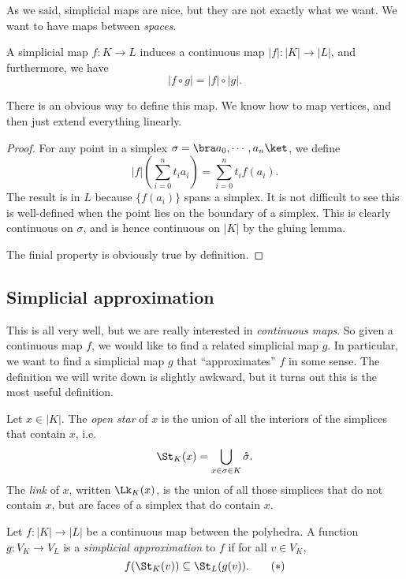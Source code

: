 \documentclass[a4paper]{article}
\begin{document}
As we said, simplicial maps are nice, but they are not exactly what we want. We want to have maps between \emph{spaces}.
\begin{lemma}
  A simplicial map $f: K \to L$ induces a continuous map $|f|: |K|\to |L|$, and furthermore, we have
  \[
    |f\circ g| = |f|\circ |g|.
  \]
\end{lemma}
There is an obvious way to define this map. We know how to map vertices, and then just extend everything linearly.
\begin{proof}
  For any point in a simplex $\sigma = \bra a_0,\cdots, a_n\ket$, we define
  \[
    |f|\left(\sum_{i = 0}^n t_i a_i\right) = \sum_{i = 0}^n t_i f(a_i).
  \]
  The result is in $L$ because $\{f(a_i)\}$ spans a simplex. It is not difficult to see this is well-defined when the point lies on the boundary of a simplex. This is clearly continuous on $\sigma$, and is hence continuous on $|K|$ by the gluing lemma.

  The finial property is obviously true by definition.
\end{proof}

\subsection{Simplicial approximation}
This is all very well, but we are really interested in \emph{continuous maps}. So given a continuous map $f$, we would like to find a related simplicial map $g$. In particular, we want to find a simplicial map $g$ that ``approximates'' $f$ in some sense. The definition we will write down is slightly awkward, but it turns out this is the most useful definition.

\begin{defi}
  Let $x \in |K|$. The \emph{open star} of $x$ is the union of all the interiors of the simplices that contain $x$, i.e.
  \[
    \St_K(x) = \bigcup_{x \in \sigma \in K} \mathring{\sigma}.
  \]
  The \emph{link} of $x$, written $\Lk_K(x)$, is the union of all those simplices that do not contain $x$, but are faces of a simplex that do contain $x$.
\end{defi}

\begin{defi}
  Let $f: |K| \to |L|$ be a continuous map between the polyhedra. A function $g: V_K \to V_L$ is a \emph{simplicial approximation} to $f$ if for all $v \in V_K$,
  \[
    f(\St_K(v)) \subseteq \St_L(g(v)).\tag{$*$}
  \]
\end{defi}
\end{document}
